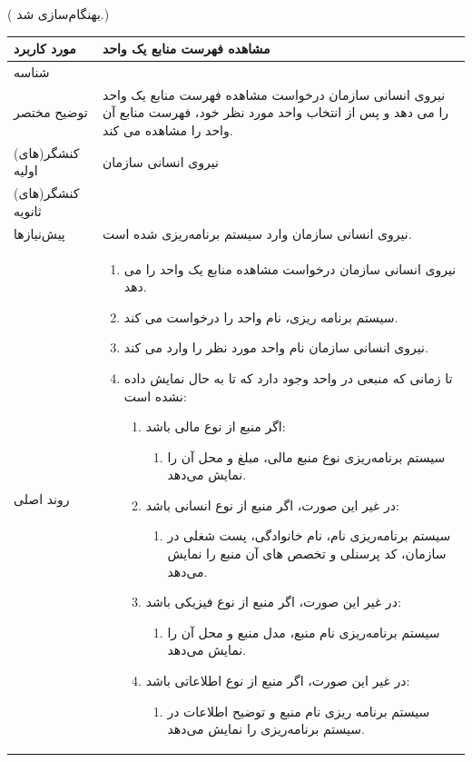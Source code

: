 ({\color{red} بهنگام‌سازی شد.})
\begin{table}[H]
	\centering
	\begin{tabular}{|p{3cm}|p{10cm}|}
		\hline
		مورد کاربرد & مشاهده فهرست منابع یک واحد  \\
		\hline
		شناسه & 
		\stepcounter{usecase_ID}
		\arabic{usecase_ID} \\
		\hline
		توضیح مختصر & نیروی انسانی سازمان درخواست مشاهده فهرست منابع یک واحد را می دهد و پس از انتخاب واحد مورد نظر خود، فهرست منابع آن واحد را مشاهده می کند.\\
		\hline
		کنشگر(های) اولیه & نیروی انسانی سازمان \\
		\hline
		کنشگر(های) ثانویه &  \\
		\hline
		پیش‌نیازها & نیروی انسانی سازمان وارد سیستم برنامه‌ریزی شده است. \\
		\hline
		
		روند اصلی &
		\begin{enumerate}[topsep=0cm,leftmargin=0.5cm]
			\item نیروی انسانی سازمان درخواست مشاهده منابع یک واحد را می دهد.
			\item سیستم برنامه ریزی، نام واحد را درخواست می کند.
			\item نیروی انسانی سازمان نام واحد مورد نظر را وارد می کند. 
			\item تا زمانی که منبعی در واحد وجود دارد که تا به حال نمایش داده نشده است:
			\begin{enumerate}[topsep=0cm,leftmargin=0.5cm]
				\item اگر منبع از نوع مالی باشد:
				\begin{enumerate}[topsep=0cm,leftmargin=0.5cm]
					\item سیستم برنامه‌ریزی نوع منبع مالی، مبلغ و محل آن را نمایش می‌دهد.
				\end{enumerate}
				\item در غیر این صورت، اگر منبع از نوع انسانی باشد:
				\begin{enumerate}[topsep=0cm,leftmargin=0.5cm]
					\item سیستم برنامه‌ریزی نام، نام خانوادگی، پست شغلی در سازمان، کد پرسنلی و تخصص های آن منبع را نمایش می‌دهد.
				\end{enumerate}
				\item در غیر این صورت، اگر منبع از نوع فیزیکی باشد:
				\begin{enumerate}[topsep=0cm,leftmargin=0.5cm]
					\item سیستم برنامه‌ریزی نام منبع، مدل منبع و محل آن را نمایش می‌دهد.
				\end{enumerate}
				\item در غیر این صورت، اگر منبع از نوع اطلاعاتی باشد:
				\begin{enumerate}[topsep=0cm,leftmargin=0.5cm]
					\item سیستم برنامه ریزی نام منبع و توضیح اطلاعات در سیستم برنامه‌ریزی را نمایش می‌دهد. 
				\end{enumerate}	
			\end{enumerate}
		\end{enumerate} \\
		

\end{tabular}
\end{table}
